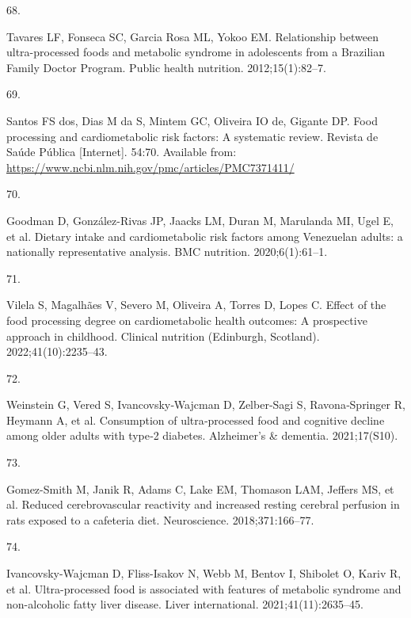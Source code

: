 \documentclass[
]{article}
\newlength{\cslhangindent}
\newlength{\csllabelwidth}
\newlength{\cslentryspacingunit} %
\newenvironment{CSLReferences}[2] %
 {%
  \setlength{\parindent}{0pt}
  \ifodd #1
  \let\oldpar\par
  \def\par{\hangindent=\cslhangindent\oldpar}
  \fi
  \setlength{\parskip}{#2\cslentryspacingunit}
 }%
 {}
\newcommand{\CSLLeftMargin}[1]{\parbox[t]{\csllabelwidth}{#1}}
\newcommand{\CSLRightInline}[1]{\parbox[t]{\linewidth - \csllabelwidth}{#1}\break}
\begin{document}
\begin{CSLReferences}{0}{0}
\leavevmode{}%
\CSLLeftMargin{68. }%
\CSLRightInline{Tavares LF, Fonseca SC, Garcia Rosa ML, Yokoo EM.
Relationship between ultra-processed foods and metabolic syndrome in
adolescents from a {Brazilian Family Doctor Program}. Public health
nutrition. 2012;15(1):82--7. }

\leavevmode{}%
\CSLLeftMargin{69. }%
\CSLRightInline{Santos FS dos, Dias M da S, Mintem GC, Oliveira IO de,
Gigante DP. Food processing and cardiometabolic risk factors: A
systematic review. Revista de Saúde Pública {[}Internet{]}. 54:70.
Available from:
\url{https://www.ncbi.nlm.nih.gov/pmc/articles/PMC7371411/}}

\leavevmode{}%
\CSLLeftMargin{70. }%
\CSLRightInline{Goodman D, González-Rivas JP, Jaacks LM, Duran M,
Marulanda MI, Ugel E, et al. Dietary intake and cardiometabolic risk
factors among Venezuelan adults: a nationally representative analysis.
BMC nutrition. 2020;6(1):61--1. }

\leavevmode{}%
\CSLLeftMargin{71. }%
\CSLRightInline{Vilela S, Magalhães V, Severo M, Oliveira A, Torres D,
Lopes C. Effect of the food processing degree on cardiometabolic health
outcomes: {A} prospective approach in childhood. Clinical nutrition
(Edinburgh, Scotland). 2022;41(10):2235--43. }

\leavevmode{}%
\CSLLeftMargin{72. }%
\CSLRightInline{Weinstein G, Vered S, Ivancovsky‐Wajcman D, Zelber‐Sagi
S, Ravona‐Springer R, Heymann A, et al. Consumption of ultra‐processed
food and cognitive decline among older adults with type‐2 diabetes.
Alzheimer's \& dementia. 2021;17(S10). }

\leavevmode{}%
\CSLLeftMargin{73. }%
\CSLRightInline{Gomez-Smith M, Janik R, Adams C, Lake EM, Thomason LAM,
Jeffers MS, et al. Reduced cerebrovascular reactivity and increased
resting cerebral perfusion in rats exposed to a cafeteria diet.
Neuroscience. 2018;371:166--77. }

\leavevmode{}%
\CSLLeftMargin{74. }%
\CSLRightInline{Ivancovsky-Wajcman D, Fliss-Isakov N, Webb M, Bentov I,
Shibolet O, Kariv R, et al. Ultra{-}processed food is associated with
features of metabolic syndrome and non{-}alcoholic fatty liver disease.
Liver international. 2021;41(11):2635--45. }


\end{CSLReferences}
\end{document}
